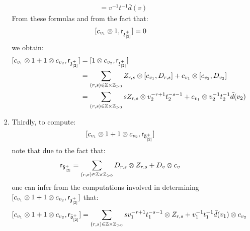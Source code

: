 \begin{remark}
\begin{enumerate}
\begin{enumerate}
\begin{enumerate}
$$\begin{aligned}
                                        & = v^{-1} t^{-1} \bar{d}(v)
                                    \end{aligned}
                                $$
                            From these formulas and from the fact that:
                                $$[c_{v_1} \tensor 1, \sfr_{\z_{[2]}^+}] = 0$$
                            we obtain:
                                $$
                                    \begin{aligned}
                                         [c_{v_1} \tensor 1 + 1 \tensor c_{v_2}, \sfr_{\z_{[2]}^+}] & = [1 \tensor c_{v_2}, \sfr_{\z_{[2]}^+}]
                                         \\
                                         & = \sum_{(r, s) \in \Z \x \Z_{> 0}} Z_{r, s} \tensor [c_{v_1}, D_{r, s}] + c_{v_1} \tensor [c_{v_2}, D_{v_2}]
                                         \\
                                         & = \sum_{(r, s) \in \Z \x \Z_{> 0}} s Z_{r, s} \tensor v_2^{-r + 1} t_2^{-s - 1} + c_{v_1} \tensor v_2^{-1} t_2^{-1} \bar{d}(v_2)
                                    \end{aligned}
                                $$
                            \item Thirdly, to compute:
                                $$[c_{v_1} \tensor 1 + 1 \tensor c_{v_2}, \sfr_{\bar{\d}_{[2]}^+}]$$
                            note that due to the fact that:
                                $$\sfr_{ \bar{\d}_{[2]}^+ } = \sum_{(r, s) \in \Z \x \Z_{> 0}} D_{r, s} \tensor Z_{r, s} + D_v \tensor c_v$$
                            one can infer from the computations involved in determining $[c_{v_1} \tensor 1 + 1 \tensor c_{v_2}, \sfr_{\z_{[2]}^+}]$ that:
                                $$[c_{v_1} \tensor 1 + 1 \tensor c_{v_2}, \sfr_{\bar{\d}_{[2]}^+}] = \sum_{(r, s) \in \Z \x \Z_{> 0}} s v_1^{-r + 1} t_1^{-s - 1} \tensor Z_{r, s} + v_1^{-1} t_1^{-1} \bar{d}(v_1) \tensor c_{v_2}$$
                        \end{enumerate}
                        

\end{enumerate}
\end{enumerate}
\end{remark}
